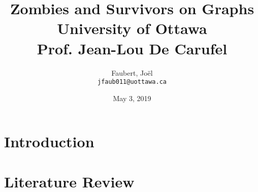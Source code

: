 \documentclass[letterpaper, 12pt]{report}
\author{
  Faubert, Jo\"el\\	\texttt{jfaub011@uottawa.ca}
}
\title{
	{Zombies and Survivors on Graphs}\\
	{\large University of Ottawa} \\
  {\large Prof. Jean-Lou De Carufel}
}
\date{May 3, 2019}
\begin{document}
\nocite{*}

\hypersetup{pageanchor=false}
\begin{titlepage}
\maketitle
\end{titlepage}
\hypersetup{pageanchor=true}


%

\tableofcontents

\cleardoublepage{}

\section{Introduction}


\section{Literature Review}





\end{document}
